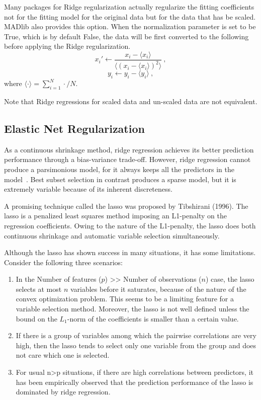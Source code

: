 Many packages for Ridge regularization actually regularize the fitting
coefficients not for the fitting model for the original data but for
the data that has be scaled. MADlib also provides this option. When
the normalization parameter is set to be True, which is by default
False, the data will be first converted to the following before
applying the Ridge regularization.
\begin{equation}
  x_i' \leftarrow \frac{x_i - \langle x_i \rangle}{\langle (x_i -
    \langle x_i \rangle)^2\rangle} \ ,
\end{equation}
\begin{equation}
y_i \leftarrow y_i - \langle y_i \rangle \ ,
\end{equation}
where $\langle \cdot \rangle = \sum_{i=1}^{N} \cdot / N$.

Note that Ridge regressions for scaled data and un-scaled data are not equivalent.

\subsection{Elastic Net Regularization} %
\label{ssub:elastic_net_regularization}
As a continuous shrinkage method, ridge regression achieves its better prediction performance through a bias-variance trade-off. However, ridge regression cannot produce a parsimonious model, for it always keeps all the predictors in the model~\cite{zou2005}. Best subset selection in contrast produces a sparse model, but it is extremely variable because of its inherent discreteness. 

A promising technique called the lasso was proposed by Tibshirani (1996). The 
lasso is a penalized least squares method imposing an L1-penalty on the 
regression coefficients. Owing to the nature of the L1-penalty, the lasso does 
both continuous shrinkage and automatic variable selection simultaneously.

Although the lasso has shown success in many situations, it has some
limitations. Consider the following three scenarios:
\begin{enumerate}

    \item In the Number of features ($p$) >> Number of observations ($n$) case, the
    lasso selects at most $n$ variables before it saturates, because of the
    nature of the convex optimization problem. This seems to be a limiting
    feature for a variable selection method. Moreover, the lasso is not well
    defined unless the bound on the $L_1$-norm of the coefficients is smaller
    than a certain value.

    \item If there is a group of variables among which the pairwise correlations are
    very high, then the lasso tends to select only one variable from the group
    and does not care which one is selected.

    \item For usual n>p situations, if there are high correlations between predictors,
    it has been empirically observed that the prediction performance of the
    lasso is dominated by ridge regression.

\end{enumerate}


